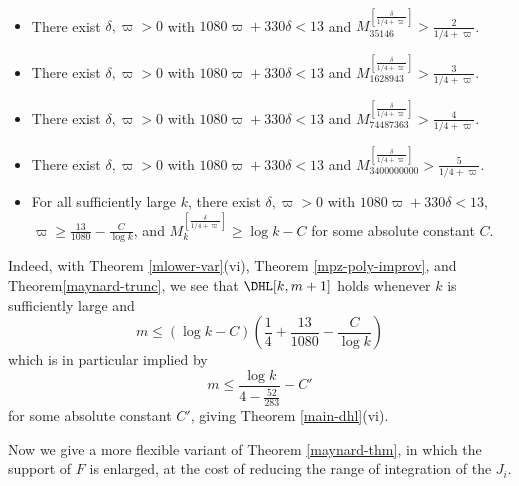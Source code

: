 \begin{theorem}\label{mlower-var}\ 
\begin{itemize}
\item[(ii)] There exist $\delta,\varpi>0$ with $1080 \varpi + 330 \delta < 13$ and $M_{\num{35146}}^{[\frac{\delta}{1/4+\varpi}]} > \frac{2}{1/4+\varpi}$.
\item[(iii)] There exist $\delta,\varpi>0$ with $1080 \varpi + 330 \delta < 13$ and $M_{\num{1628943}}^{[\frac{\delta}{1/4+\varpi}]} > \frac{3}{1/4+\varpi}$.
\item[(iv)] There exist $\delta,\varpi>0$ with $1080 \varpi + 330 \delta < 13$ and $M_{\num{74487363}}^{[\frac{\delta}{1/4+\varpi}]} > \frac{4}{1/4+\varpi}$.
\item[(v)] There exist $\delta,\varpi>0$ with $1080 \varpi + 330 \delta < 13$ and $M_{\num{3400000000}}^{[\frac{\delta}{1/4+\varpi}]} > \frac{5}{1/4+\varpi}$.
\item[(vi)] For all sufficiently large $k$, there exist $\delta,\varpi>0$ with $1080 \varpi + 330 \delta < 13$, $\varpi \geq \frac{13}{1080} - \frac{C}{\log k}$, and $M_k^{[\frac{\delta}{1/4+\varpi}]} \geq \log k - C$ for some absolute constant $C$.
\end{itemize}
\end{theorem}

Indeed, with Theorem \ref{mlower-var}(vi), Theorem \ref{mpz-poly-improv}, and Theorem\ref{maynard-trunc}, we see that $\DHL[k,m+1]$ holds whenever $k$ is sufficiently large and
$$ m \leq (\log k - C) (\frac{1}{4} + \frac{13}{1080} - \frac{C}{\log k})$$
which is in particular implied by
$$ m \leq \frac{\log k}{4 - \frac{52}{283}} - C'$$
for some absolute constant $C'$, giving Theorem \ref{main-dhl}(vi).

Now we give a more flexible variant of Theorem \ref{maynard-thm}, in which the support of $F$ is enlarged, at the cost of reducing the range of integration of the $J_i$.

